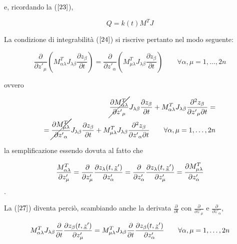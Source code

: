 e, ricordando la ($ \ref{23} $),

\begin{equation*}
  Q = k(t) M^T J
\end{equation*}


La condizione di integrabilità ($ \ref{24} $) si riscrive pertanto nel modo seguente:

\begin{equation} \label{26}
  \frac{\partial}{\partial {z'}_\mu} \left(M^T_{\alpha\lambda} J_{\lambda\beta} \frac{\partial z_\beta}{\partial t} \right) = \frac{\partial}{\partial {z'}_\alpha} \left(M^T_{\mu\lambda} J_{\lambda\beta} \frac{\partial z_\beta}{\partial t} \right) \qquad \forall \alpha, \mu = 1, \dots , 2n
\end{equation}

ovvero

\begin{equation} \label{27}
  \begin{split}
    \cancel{ \frac{\partial M^T_{\alpha\lambda}}{\partial {z'}_\mu} } J_{\lambda\beta} \frac{\partial z_\beta}{\partial t} + M^T_{\alpha\lambda} J_{\lambda\beta} \frac{\partial^2 z_\beta}{\partial {z'}_\mu \partial t} = \\
    = \cancel {\frac{\partial M^T_{\mu\lambda}}{\partial {z'}_\alpha} } J_{\lambda\beta} \frac{\partial z_\beta}{\partial t} + M^T_{\mu\lambda} J_{\lambda\beta} \frac{\partial^2 z_\beta}{\partial {z'}_\alpha \partial t} \qquad \forall \alpha, \mu = 1, \dots , 2n
  \end{split}
\end{equation}

la semplificazione essendo dovuta al fatto che

\begin{equation*}
  \frac{M^T_{\alpha\lambda}}{\partial z'_\mu} = \frac{\partial}{\partial z'_\mu} \frac{\partial z_\lambda(t, \uline{z}')}{\partial z'_\alpha} = \frac{\partial}{\partial z'_\alpha} \frac{\partial z_\lambda(t, \uline{z}')}{\partial z'_\mu} = \frac{\partial M^T_{\mu\lambda}}{\partial z'_\alpha}
\end{equation*}.

La ($ \ref{27} $) diventa perciò, scambiando anche la derivata $ \frac{\partial}{\partial t} $ con $ \frac{\partial}{\partial z'_\mu} $ e $ \frac{\partial}{\partial z'_\alpha} $,

\begin{equation*}
  M^T_{\alpha\lambda} J_{\lambda\beta} \frac{\partial}{\partial t} \frac{\partial z_\beta(t, \uline{z}')}{\partial z'_\mu} = M^T_{\mu\lambda} J_{\lambda\beta} \frac{\partial}{\partial t} \frac{\partial z_\beta(t, \uline{z}')}{\partial z'_\alpha} \qquad \forall \alpha, \mu = 1, \dots , 2n
\end{equation*}

